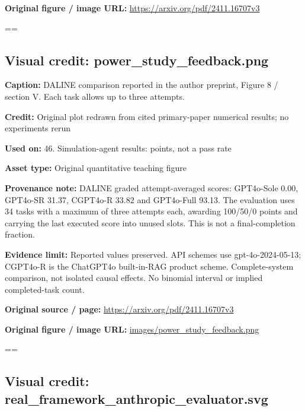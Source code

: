 \documentclass[10pt,letterpaper]{article}
\begin{document}
\textbf{Original figure / image URL:} \href{https://arxiv.org/pdf/2411.16707v3}{\small\ttfamily https:/\allowbreak{}/\allowbreak{}arxiv.\allowbreak{}org/\allowbreak{}pdf/\allowbreak{}2411.\allowbreak{}16707v3}\par
\egroup\par\noindent\box\readingEntry\par\medskip
\setbox\readingEntry=\vbox\bgroup\hsize=\linewidth\subsection*{Visual credit: power\_study\_feedback.png}
\textbf{Caption:} DALINE comparison reported in the author preprint, Figure 8 / section V. Each task allows up to three attempts.\par
\textbf{Credit:} Original plot redrawn from cited primary-paper numerical results; no experiments rerun\par
\textbf{Used on:} 46. Simulation-agent results: points, not a pass rate\par
\textbf{Asset type:} Original quantitative teaching figure\par
\textbf{Provenance note:} DALINE graded attempt-averaged scores: GPT4o-Sole 0.00, GPT4o-SR 31.37, CGPT4o-R 33.82 and GPT4o-Full 93.13. The evaluation uses 34 tasks with a maximum of three attempts each, awarding 100/50/0 points and carrying the last executed score into unused slots. This is not a final-completion fraction.\par
\textbf{Evidence limit:} Reported values preserved. API schemes use gpt-4o-2024-05-13; CGPT4o-R is the ChatGPT4o built-in-RAG product scheme. Complete-system comparison, not isolated causal effects. No binomial interval or implied completed-task count.\par
\textbf{Original source / page:} \href{https://arxiv.org/pdf/2411.16707v3}{\small\ttfamily https:/\allowbreak{}/\allowbreak{}arxiv.\allowbreak{}org/\allowbreak{}pdf/\allowbreak{}2411.\allowbreak{}16707v3}\par
\textbf{Original figure / image URL:} \href{images/power_study_feedback.png}{\small\ttfamily images/\allowbreak{}power\_\allowbreak{}study\_\allowbreak{}feedback.\allowbreak{}png}\par
\egroup\par\noindent\box\readingEntry\par\medskip
\setbox\readingEntry=\vbox\bgroup\hsize=\linewidth\subsection*{Visual credit: real\_framework\_anthropic\_evaluator.svg}
\end{document}
